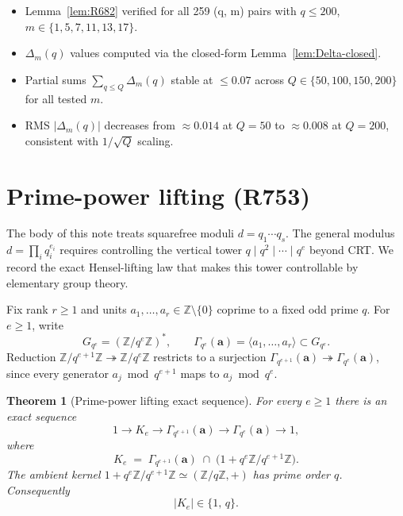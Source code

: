 \documentclass[12pt]{amsart}
\newtheorem{theorem}{Theorem}
\theoremstyle{definition}
\theoremstyle{remark}
\begin{document}
\begin{itemize}
\item Lemma~\ref{lem:R682} verified for all 259 (q, m) pairs with $q \le 200$, $m \in \{1, 5, 7, 11, 13, 17\}$.
\item $\Delta_m(q)$ values computed via the closed-form Lemma~\ref{lem:Delta-closed}.
\item Partial sums $\sum_{q \le Q} \Delta_m(q)$ stable at $\le 0.07$ across $Q \in \{50, 100, 150, 200\}$ for all tested $m$.
\item RMS $|\Delta_m(q)|$ decreases from $\approx 0.014$ at $Q = 50$ to $\approx 0.008$ at $Q = 200$, consistent with $1/\sqrt{Q}$ scaling.
\end{itemize}

\section{Prime-power lifting (R753)}

The body of this note treats squarefree moduli $d=q_1\cdots q_s$.  The general modulus
$d=\prod_i q_i^{e_i}$ requires controlling the vertical tower $q\mid q^2\mid\cdots\mid q^e$
beyond CRT.  We record the exact Hensel-lifting law that makes this tower controllable
by elementary group theory.

Fix rank $r\ge 1$ and units $a_1,\ldots,a_r\in\mathbb Z\setminus\{0\}$ coprime to a fixed odd
prime $q$.  For $e\ge 1$, write
$$
G_{q^e}=(\mathbb Z/q^e\mathbb Z)^*,
\qquad
\Gamma_{q^e}(\mathbf a)=\langle a_1,\ldots,a_r\rangle\subset G_{q^e}.
$$
Reduction $\mathbb Z/q^{e+1}\mathbb Z\twoheadrightarrow\mathbb Z/q^e\mathbb Z$ restricts to a
surjection $\Gamma_{q^{e+1}}(\mathbf a)\twoheadrightarrow\Gamma_{q^e}(\mathbf a)$, since
every generator $a_j\bmod q^{e+1}$ maps to $a_j\bmod q^e$.

\begin{theorem}[Prime-power lifting exact sequence]\label{thm:R753-primepower}
For every $e\ge 1$ there is an exact sequence
$$
1\longrightarrow K_e\longrightarrow
\Gamma_{q^{e+1}}(\mathbf a)\longrightarrow
\Gamma_{q^e}(\mathbf a)\longrightarrow 1,
$$
where
$$
K_e\;=\;\Gamma_{q^{e+1}}(\mathbf a)\;\cap\;
\bigl(1+q^e\mathbb Z/q^{e+1}\mathbb Z\bigr).
$$
The ambient kernel
$1+q^e\mathbb Z/q^{e+1}\mathbb Z\simeq(\mathbb Z/q\mathbb Z,+)$
has prime order $q$.  Consequently
$$
|K_e|\in\{1,\,q\}.
$$
\end{theorem}
\end{document}
